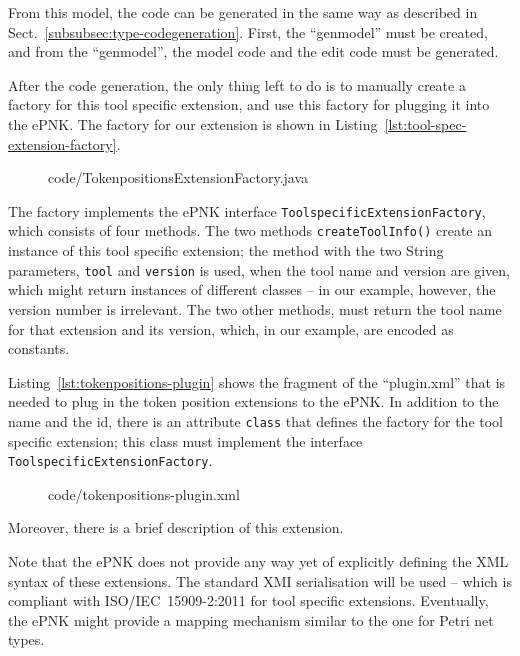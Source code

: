 From this model, the code can be generated in the same way as described in
Sect.~\ref{subsubsec:type-codegeneration}. First, the ``genmodel'' must be
created, and from the ``genmodel'', the model code and the edit code must be
generated.

After the code generation, the only thing left to do is to manually create a
factory for this tool specific extension, and use this factory for plugging
it into the ePNK. The factory for our extension is shown in
Listing~\ref{lst:tool-spec-extension-factory}.
%
\begin{figure}[htbp!]
%
{code/TokenpositionsExtensionFactory.java}
\end{figure}
%
The factory implements the ePNK interface {\tt ToolspecificExtensionFactory},%
which consists of four methods. The two methods {\tt createToolInfo()}%
create an instance of this tool specific extension; the method with the two
String parameters, {\tt tool} and {\tt version} is used, when the tool
name and version are given, which might return instances of different classes --
in our example, however, the version number is irrelevant. The two other
methods, must return the tool name for that extension and its version, which, in
our example, are encoded as constants.

Listing~\ref{lst:tokenpositions-plugin} shows the fragment of the ``plugin.xml''
that is needed to plug in the token position extensions to the ePNK. In
addition to the name and the id, there is an attribute {\tt class}
that defines the factory for the tool specific extension; this class must
implement the interface {\tt Toolspecific\optsep{}ExtensionFactory}.
%
\begin{figure}[htbp!]
%
{code/tokenpositions-plugin.xml}
\end{figure}
%
Moreover, there is a brief description of this extension. 

Note that the ePNK does not provide any way yet of explicitly defining the XML
syntax of these extensions. The standard XMI serialisation will be used --
which is compliant with ISO/IEC~15909-2:2011 for tool specific extensions.
Eventually, the ePNK might provide a mapping mechanism similar to the one
for Petri net types.%

